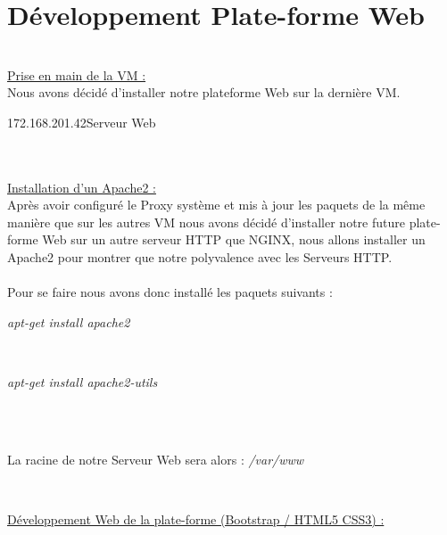 \documentclass{report}
\begin{document}
    \newpage
    
    \section{Développement Plate-forme Web} 
    \\
    
    \underline{Prise en main de la VM :}\\
    
    Nous avons décidé d’installer notre plateforme Web sur la dernière VM. \\

    \begin{center}

    172.168.201.42\rightarrow Serveur Web


    \end{center}
    
    \\
    \\
    
    \underline{Installation d’un Apache2 :}\\
    
    Après avoir configuré le Proxy système et mis à jour les paquets de la même manière que sur les autres VM nous avons décidé d’installer notre future plate-forme Web sur un autre serveur HTTP que NGINX, nous allons installer un Apache2 pour montrer que notre polyvalence avec les Serveurs HTTP.
    \\
    \\
    Pour se faire nous avons donc installé les paquets suivants :
    \\
    \begin{center}
    \textit{apt-get install apache2}
    \end{center}
    \\
    \begin{center}
    \textit{apt-get install apache2-utils}
    \end{center}
    \\
    \\
    \begin{center}
    La racine de notre Serveur Web sera alors : \textit{/var/www}
    \end{center}
    \\
    \hfill
    
    \underline{Développement Web de la plate-forme (Bootstrap / HTML5 CSS3) :}\\
    
\end{document}
